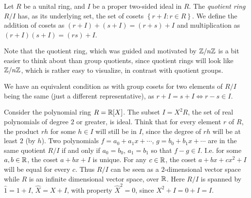 \begin{definition}
  Let $R$ be a unital ring, and $I$ be a proper two-sided ideal in $R$. The
  \emph{quotient ring} $R/I$ has, as its underlying set, the set of cosets $\left\{ r+I : r\in R
  \right\}$. We define the addition of cosets as $(r+I)+(s+I)=(r+s)+I$ and multiplication
  as $(r+I)(s+I)=(rs)+I$. 
  \label{<+label+>}
\end{definition}

Note that the quotient ring, which was guided and motivated by $\mathbb Z/n\mathbb Z$ is a bit easier
to think about than group quotients, since quotient rings will look like $\mathbb Z/n\mathbb Z$, which
is rather easy to visualize, in contrast with quotient groups.

We have an equivalent condition as with group cosets for two elements of $R/I$ being the same (just a different representative), as $r + I = s + I \iff r - s \in I$.

\begin{example}
  Consider the polynomial ring $R=\mathbb R[X]$. The subset $I=X^2 R$, the set of real
  polynomials of degree $2$ or greater, is ideal. Think that for every element $r$ of $R$, the
  product $rh$ for some $h\in I$ will still be in $I$, since the degree of $rh$ will be at
  least $2$ (by $h$). Two polynomials $f=a_0+a_1x+\cdots$, $g=b_0+b_1x+\cdots$ are in the
  same quotient $R/I$ if and only if $a_0=b_0$, $a_1=b_1$ so that $f-g\in I$. I.e. for
  some $a,b\in \mathbb R$, the coset $a+bx+I$ is unique. For any $c\in\mathbb R$, the coset
  $a+bx+cx^2+I$ will be equal for every $c$. Thus $R/I$ can be seen as a $2$-dimensional
  vector space while $R$ is an infinite dimensional vector space, over $\mathbb R$. Here $R/I$
  is spanned by $\hat{1}=1+I$, $\hat{X}=X+I$, with property $\hat{X}^2=0$, since
  $X^2+I=0+I=I$.
\end{example}
